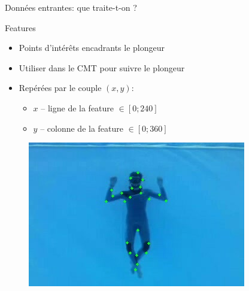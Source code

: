 \documentclass{bredelebeamer}
\begin{document}
\begin{frame}{Données entrantes: que traite-t-on ?}


\begin{block}{Features}
\begin{itemize}
\item Points d'intér\^ets encadrants le plongeur
\item Utiliser dans le CMT pour suivre le plongeur
\item Repérées par le couple $(x,y)$:
	\begin{itemize}
		\item $x$ -- ligne de la feature $\in \left[0;240\right]$
		\item $y$ -- colonne de la feature $\in \left[0;360\right]$
	\end{itemize}
\end{itemize}
\end{block}

\begin{figure}
\centering
\includegraphics[scale=0.5]{images/plongeurInitFeatures.jpeg}
\end{figure}


\end{frame}

\end{document}
